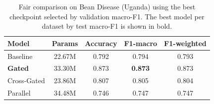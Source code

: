 \begin{table}[t]
\centering
\caption{Fair comparison on Bean Disease (Uganda) using the best checkpoint selected by validation macro-F1. The best model per dataset by test macro-F1 is shown in bold.}
\label{tab:dino_fair_bean_disease_uganda}
\begin{tabular}{lcccc}
\toprule
\textbf{Model} & \textbf{Params} & \textbf{Accuracy} & \textbf{F1-macro} & \textbf{F1-weighted}\\
\midrule
Baseline & 22.67M & 0.792 & 0.794 & 0.793\\
\textbf{Gated} & 33.30M & 0.873 & \textbf{0.873} & 0.873\\
Cross-Gated & 23.86M & 0.807 & 0.805 & 0.804\\
Parallel & 34.48M & 0.746 & 0.747 & 0.747\\
\bottomrule
\end{tabular}
\end{table}